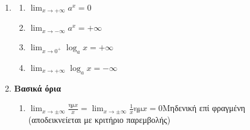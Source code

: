 \documentclass[twoside,nofonts,ektypwsh,math,spyros]{frontisthrio}
\begin{document}
\begin{enumerate}[label=\bf\arabic*.]
\begin{multicols}{2}
\begin{enumerate}[itemsep=0mm,label=\alph*.]
\item $ \displaystyle{\lim_{x\rightarrow+\infty}a^x}=+\infty $
\item $ \displaystyle{\lim_{x\rightarrow-\infty}a^x}=0 $
\item $ \displaystyle{\lim_{x\rightarrow0^+}\log_ax}=-\infty $
\item $ \displaystyle{\lim_{x\rightarrow+\infty}\log_ax}=+\infty $
\end{enumerate}
\end{multicols}
\item {}
\begin{multicols}{2}
\begin{enumerate}[itemsep=0mm,label=\alph*.]
\item $ \displaystyle{\lim_{x\rightarrow+\infty}a^x}=0 $
\item $ \displaystyle{\lim_{x\rightarrow-\infty}a^x}=+\infty $
\item $ \displaystyle{\lim_{x\rightarrow0^+}\log_ax}=+\infty $
\item $ \displaystyle{\lim_{x\rightarrow+\infty}\log_ax}=-\infty $
\end{enumerate}
\end{multicols}
\item \textbf{Βασικά όρια}
\begin{enumerate}[itemsep=0mm,label=\alph*.]
\item $ \displaystyle{\lim_{x\rightarrow\pm\infty}\frac{\textrm{ημ}x}{x}}=\displaystyle{\lim_{x\rightarrow\pm\infty}\frac{1}{x}{\textrm{ημ}x}}=0 $\quad Μηδενική επί φραγμένη (αποδεικνείεται με κριτήριο παρεμβολής)

\end{enumerate}
\end{enumerate}
\end{document}
